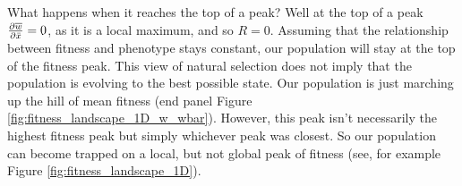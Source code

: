 What happens when it
reaches the top of a peak? Well at the top of a peak $ \frac{\partial
  \overline{w}}{\partial \bar{x}}=0$, as it is a local maximum, and so
$R=0$. Assuming that the relationship between fitness and phenotype
stays constant, our population will stay at the top of the fitness
peak. This view of natural selection does not imply that the population
is evolving to the best possible state. Our population is just
marching up the hill of mean fitness (end panel Figure
\ref{fig:fitness_landscape_1D_w_wbar}). However, this peak isn't
necessarily the highest fitness peak but simply whichever peak was closest. So our population can become trapped
on a local, but not global peak of fitness (see, for example Figure \ref{fig:fitness_landscape_1D}).



